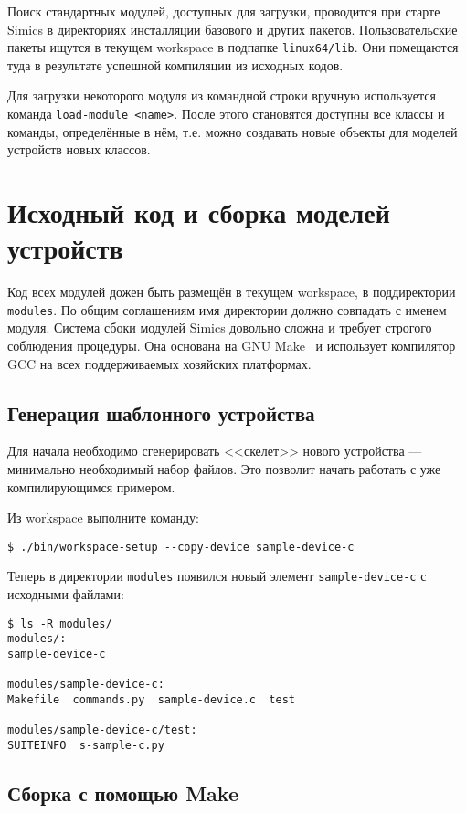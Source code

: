Поиск стандартных модулей, доступных для загрузки, проводится при старте Simics в директориях инсталляции базового и других пакетов. Пользовательские пакеты ищутся в текущем workspace в подпапке \texttt{linux64/lib}. Они помещаются туда в результате успешной компиляции из исходных кодов.

Для загрузки некоторого модуля из командной строки вручную используется команда \texttt{load-module <name>}. После этого становятся доступны все классы и команды, определённые в нём, т.е. можно создавать новые объекты для моделей устройств новых классов.

\section[Исходный код и сборка]{Исходный код и сборка моделей устройств}

Код всех модулей дожен быть размещён в текущем workspace, в поддиректории \texttt{modules}. По общим соглашениям имя директории должно совпадать с именем модуля.
Система сбоки модулей Simics довольно сложна и требует строгого соблюдения процедуры. Она основана на GNU Make~\cite{gmake} и использует компилятор GCC на всех поддерживаемых хозяйских платформах.

\subsection{Генерация шаблонного устройства}

Для начала необходимо сгенерировать <<скелет>> нового устройства --- минимально необходимый набор файлов. Это позволит начать работать с уже компилирующимся примером.

Из workspace выполните команду:

\begin{lstlisting}
$ ./bin/workspace-setup --copy-device sample-device-c
\end{lstlisting}

Теперь в директории \texttt{modules} появился новый элемент \texttt{sample-device-c} с исходными файлами:
\begin{lstlisting}
$ ls -R modules/
modules/:
sample-device-c

modules/sample-device-c:
Makefile  commands.py  sample-device.c  test

modules/sample-device-c/test:
SUITEINFO  s-sample-c.py
\end{lstlisting}

\subsection{Сборка с помощью Make}

